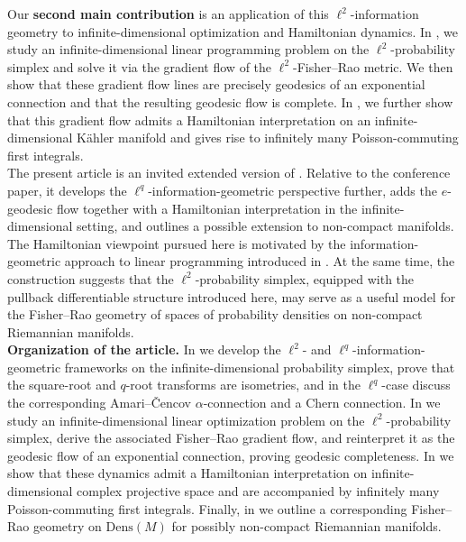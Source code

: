 \documentclass[12pt]{amsart}
\numberwithin{figure}{section}
\numberwithin{table}{section}
\numberwithin{equation}{section}
\begin{document}
Our \textbf{second main contribution} is an application of this \(\ell^2\)-information geometry to infinite-dimensional optimization and Hamiltonian dynamics. In , we study an infinite-dimensional linear programming problem on the \(\ell^2\)-probability simplex and solve it via the gradient flow of the \(\ell^2\)-Fisher--Rao metric. We then show that these gradient flow lines are precisely geodesics of an exponential connection and that the resulting geodesic flow is complete. In , we further show that this gradient flow admits a Hamiltonian interpretation on an infinite-dimensional Kähler manifold and gives rise to infinitely many Poisson-commuting first integrals.\\

The present article is an invited extended version of \cite{Maier_GSI_2026}. Relative to the conference paper, it develops the \(\ell^q\)-information-geometric perspective further, adds the \(e\)-geodesic flow together with a Hamiltonian interpretation in the infinite-dimensional setting, and outlines a possible extension to non-compact manifolds. The Hamiltonian viewpoint pursued here is motivated by the information-geometric approach to linear programming introduced in \cite{faybusovich_hamiltonian_1991}. At the same time, the construction suggests that the \(\ell^2\)-probability simplex, equipped with the pullback differentiable structure introduced here, may serve as a useful model for the Fisher--Rao geometry of spaces of probability densities on non-compact Riemannian manifolds.\\

\noindent\textbf{Organization of the article.}
In  we develop the \(\ell^2\)- and \(\ell^q\)-information-geometric frameworks on the infinite-dimensional probability simplex, prove that the square-root and \(q\)-root transforms are isometries, and in the \(\ell^q\)-case discuss the corresponding Amari--\v{C}encov \(\alpha\)-connection and a Chern connection. In  we study an infinite-dimensional linear optimization problem on the \(\ell^2\)-probability simplex, derive the associated Fisher--Rao gradient flow, and reinterpret it as the geodesic flow of an exponential connection, proving geodesic completeness. In  we show that these dynamics admit a Hamiltonian interpretation on infinite-dimensional complex projective space and are accompanied by infinitely many Poisson-commuting first integrals. Finally, in  we outline a corresponding Fisher--Rao geometry on \(\mathrm{Dens}(M)\) for possibly non-compact Riemannian manifolds.
\end{document}
